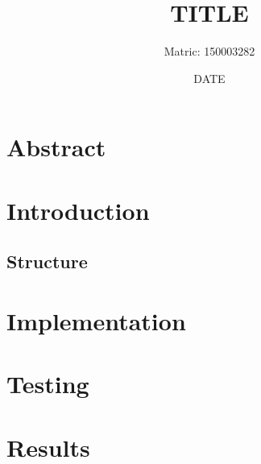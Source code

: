\documentclass[a4paper,11pt]{article}
\title{TITLE}
\author{Matric: 150003282}
\date{DATE}
\begin{document}
	
	\maketitle
	\section*{Abstract}
	
	\pagebreak
	\section{Introduction}
	\subsection{Structure}
	
	\section{Implementation}
	
	\section{Testing}
	
	\section{Results}
	
	\pagebreak
	\begin{thebibliography}{9}
		
		
		
		
		
	\end{thebibliography}
\end{document}
